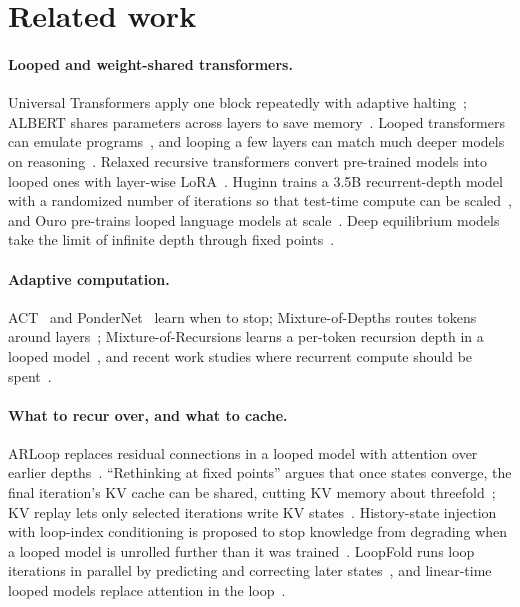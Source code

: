 \section{Related work}

\paragraph{Looped and weight-shared transformers.} Universal Transformers apply one block repeatedly
with adaptive halting~\citep{dehghani2019universal}; ALBERT shares parameters across layers to save
memory~\citep{lan2020albert}. Looped transformers can emulate programs~\citep{giannou2023looped}, and
looping a few layers can match much deeper models on reasoning~\citep{saunshi2025reasoning}. Relaxed
recursive transformers convert pre-trained models into looped ones with layer-wise
LoRA~\citep{bae2025relaxed}. Huginn trains a 3.5B recurrent-depth model with a randomized number of
iterations so that test-time compute can be scaled~\citep{geiping2025scaling}, and Ouro pre-trains
looped language models at scale~\citep{zhu2025ouro}. Deep equilibrium models take the limit of
infinite depth through fixed points~\citep{bai2019deep}.

\paragraph{Adaptive computation.} ACT~\citep{graves2016adaptive} and PonderNet~\citep{banino2021pondernet}
learn when to stop; Mixture-of-Depths routes tokens around layers~\citep{raposo2024mixture};
Mixture-of-Recursions learns a per-token recursion depth in a looped model~\citep{bae2025mixture}, and
recent work studies where recurrent compute should be spent~\citep{lin2026allocating}.

\paragraph{What to recur over, and what to cache.} ARLoop replaces residual connections in a looped
model with attention over earlier depths~\citep{yao2026arloop}. ``Rethinking at fixed points'' argues
that once states converge, the final iteration's KV cache can be shared, cutting KV memory about
threefold~\citep{huang2026looped}; KV replay lets only selected iterations write KV
states~\citep{licakova2026kvreplay}. History-state injection with loop-index conditioning is proposed to
stop knowledge from degrading when a looped model is unrolled further than it was
trained~\citep{zhuang2026recurrence}. LoopFold runs loop iterations in parallel by predicting and
correcting later states~\citep{song2026loopfold}, and linear-time looped models replace attention in the
loop~\citep{deng2026lt2}.

